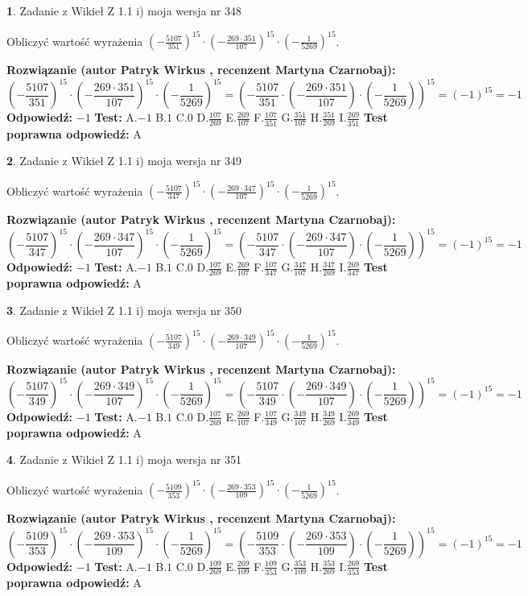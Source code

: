 \documentclass[12pt, a4paper]{article}
\theoremstyle{definition} %
\newtheorem{zad}{}
\newcommand{\zadStart}[1]{\begin{zad}#1\newline}
\newcommand{\zadStop}{\end{zad}}
\newcommand{\rozwStart}[2]{\noindent \textbf{Rozwiązanie (autor #1 , recenzent #2): }\newline}
\newcommand{\rozwStop}{\newline}
\newcommand{\odpStart}{\noindent \textbf{Odpowiedź:}\newline}
\newcommand{\odpStop}{\newline}
\newcommand{\testStart}{\noindent \textbf{Test:}\newline}
\newcommand{\testStop}{\newline}
\newcommand{\kluczStart}{\noindent \textbf{Test poprawna odpowiedź:}\newline}
\newcommand{\kluczStop}{\newline}
\begin{document}
\zadStart{Zadanie z Wikieł Z 1.1 i) moja wersja nr 348}

Obliczyć wartość wyrażenia $(-\frac{5107}{351})^{15} \cdot (-\frac{269 \cdot 351}{107})^{15} \cdot (-\frac{1}{5269})^{15}$.
\zadStop
\rozwStart{Patryk Wirkus}{Martyna Czarnobaj}
$$(-\frac{5107}{351})^{15} \cdot (-\frac{269 \cdot 351}{107})^{15} \cdot (-\frac{1}{5269})^{15} = (-\frac{5107}{351} \cdot (-\frac{269 \cdot 351}{107}) \cdot (-\frac{1}{5269}))^{15} = (-1)^{15} = -1$$
\rozwStop
\odpStart
$-1$
\odpStop
\testStart
A.$-1$ B.$1$ C.$0$ D.$\frac{107}{269}$ E.$\frac{269}{107}$
F.$\frac{107}{351}$ G.$\frac{351}{107}$
H.$\frac{351}{269}$
I.$\frac{269}{351}$
\testStop
\kluczStart
A
\kluczStop



\zadStart{Zadanie z Wikieł Z 1.1 i) moja wersja nr 349}

Obliczyć wartość wyrażenia $(-\frac{5107}{347})^{15} \cdot (-\frac{269 \cdot 347}{107})^{15} \cdot (-\frac{1}{5269})^{15}$.
\zadStop
\rozwStart{Patryk Wirkus}{Martyna Czarnobaj}
$$(-\frac{5107}{347})^{15} \cdot (-\frac{269 \cdot 347}{107})^{15} \cdot (-\frac{1}{5269})^{15} = (-\frac{5107}{347} \cdot (-\frac{269 \cdot 347}{107}) \cdot (-\frac{1}{5269}))^{15} = (-1)^{15} = -1$$
\rozwStop
\odpStart
$-1$
\odpStop
\testStart
A.$-1$ B.$1$ C.$0$ D.$\frac{107}{269}$ E.$\frac{269}{107}$
F.$\frac{107}{347}$ G.$\frac{347}{107}$
H.$\frac{347}{269}$
I.$\frac{269}{347}$
\testStop
\kluczStart
A
\kluczStop



\zadStart{Zadanie z Wikieł Z 1.1 i) moja wersja nr 350}

Obliczyć wartość wyrażenia $(-\frac{5107}{349})^{15} \cdot (-\frac{269 \cdot 349}{107})^{15} \cdot (-\frac{1}{5269})^{15}$.
\zadStop
\rozwStart{Patryk Wirkus}{Martyna Czarnobaj}
$$(-\frac{5107}{349})^{15} \cdot (-\frac{269 \cdot 349}{107})^{15} \cdot (-\frac{1}{5269})^{15} = (-\frac{5107}{349} \cdot (-\frac{269 \cdot 349}{107}) \cdot (-\frac{1}{5269}))^{15} = (-1)^{15} = -1$$
\rozwStop
\odpStart
$-1$
\odpStop
\testStart
A.$-1$ B.$1$ C.$0$ D.$\frac{107}{269}$ E.$\frac{269}{107}$
F.$\frac{107}{349}$ G.$\frac{349}{107}$
H.$\frac{349}{269}$
I.$\frac{269}{349}$
\testStop
\kluczStart
A
\kluczStop



\zadStart{Zadanie z Wikieł Z 1.1 i) moja wersja nr 351}

Obliczyć wartość wyrażenia $(-\frac{5109}{353})^{15} \cdot (-\frac{269 \cdot 353}{109})^{15} \cdot (-\frac{1}{5269})^{15}$.
\zadStop
\rozwStart{Patryk Wirkus}{Martyna Czarnobaj}
$$(-\frac{5109}{353})^{15} \cdot (-\frac{269 \cdot 353}{109})^{15} \cdot (-\frac{1}{5269})^{15} = (-\frac{5109}{353} \cdot (-\frac{269 \cdot 353}{109}) \cdot (-\frac{1}{5269}))^{15} = (-1)^{15} = -1$$
\rozwStop
\odpStart
$-1$
\odpStop
\testStart
A.$-1$ B.$1$ C.$0$ D.$\frac{109}{269}$ E.$\frac{269}{109}$
F.$\frac{109}{353}$ G.$\frac{353}{109}$
H.$\frac{353}{269}$
I.$\frac{269}{353}$
\testStop
\kluczStart
A
\kluczStop
\end{document}

